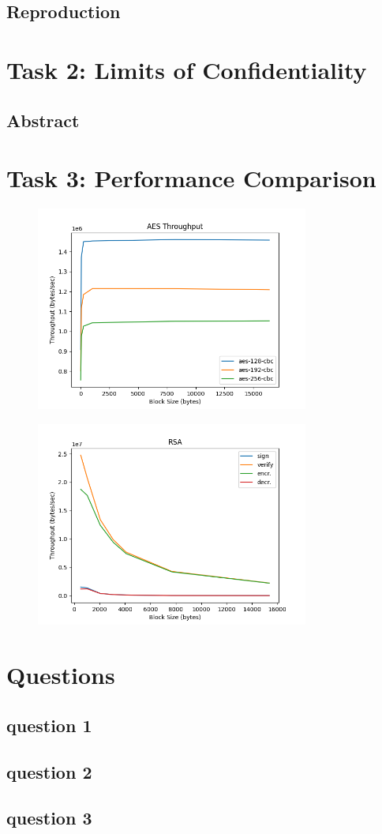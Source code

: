 \documentclass[11pt]{article}
\begin{document}
\subsection*{Reproduction}


\section*{Task 2: Limits of Confidentiality}
\subsection*{Abstract}


\section*{Task 3: Performance Comparison}
\begin{figure}
	\centering
	\includegraphics[width=0.8\textwidth]{./plts/aes.png}
	\label{fig.1: Performance of AES}
\end{figure}

\begin{figure}
	\centering
	\includegraphics[width=0.8\textwidth]{./plts/rsa.png}
	\label{fig.2: Performance of RSA}
\end{figure}

\section*{Questions}
\subsection*{question 1}
\subsection*{question 2}
\subsection*{question 3}
\end{document}
